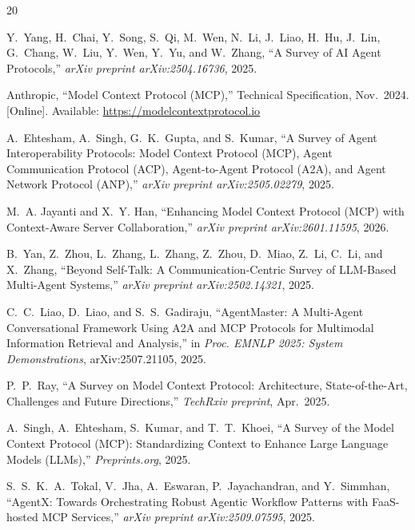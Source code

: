 \documentclass[10pt,journal,compsoc]{IEEEtran}
\begin{document}
\ifCLASSOPTIONcaptionsoff
  \newpage
\fi


\begin{thebibliography}{20}

Y.~Yang, H.~Chai, Y.~Song, S.~Qi, M.~Wen, N.~Li, J.~Liao, H.~Hu, J.~Lin,
G.~Chang, W.~Liu, Y.~Wen, Y.~Yu, and W.~Zhang, ``A Survey of AI Agent
Protocols,'' \emph{arXiv preprint arXiv:2504.16736}, 2025.

Anthropic, ``Model Context Protocol (MCP),'' Technical Specification, Nov.~2024.
[Online]. Available: \url{https://modelcontextprotocol.io}

A.~Ehtesham, A.~Singh, G.~K.~Gupta, and S.~Kumar, ``A Survey of Agent
Interoperability Protocols: Model Context Protocol (MCP), Agent Communication
Protocol (ACP), Agent-to-Agent Protocol (A2A), and Agent Network Protocol (ANP),''
\emph{arXiv preprint arXiv:2505.02279}, 2025.

M.~A. Jayanti and X.~Y. Han, ``Enhancing Model Context Protocol (MCP) with
Context-Aware Server Collaboration,'' \emph{arXiv preprint arXiv:2601.11595}, 2026.

B.~Yan, Z.~Zhou, L.~Zhang, L.~Zhang, Z.~Zhou, D.~Miao, Z.~Li, C.~Li, and
X.~Zhang, ``Beyond Self-Talk: A Communication-Centric Survey of LLM-Based
Multi-Agent Systems,'' \emph{arXiv preprint arXiv:2502.14321}, 2025.

C.~C.~Liao, D.~Liao, and S.~S.~Gadiraju, ``AgentMaster: A Multi-Agent
Conversational Framework Using A2A and MCP Protocols for Multimodal Information
Retrieval and Analysis,'' in \emph{Proc. EMNLP 2025: System Demonstrations},
arXiv:2507.21105, 2025.

P.~P.~Ray, ``A Survey on Model Context Protocol: Architecture, State-of-the-Art,
Challenges and Future Directions,'' \emph{TechRxiv preprint}, Apr.~2025.

A.~Singh, A.~Ehtesham, S.~Kumar, and T.~T.~Khoei, ``A Survey of the Model Context
Protocol (MCP): Standardizing Context to Enhance Large Language Models (LLMs),''
\emph{Preprints.org}, 2025.

S.~S.~K.~A.~Tokal, V.~Jha, A.~Eswaran, P.~Jayachandran, and Y.~Simmhan,
``AgentX: Towards Orchestrating Robust Agentic Workflow Patterns with FaaS-hosted
MCP Services,'' \emph{arXiv preprint arXiv:2509.07595}, 2025.


\end{thebibliography}
\end{document}
